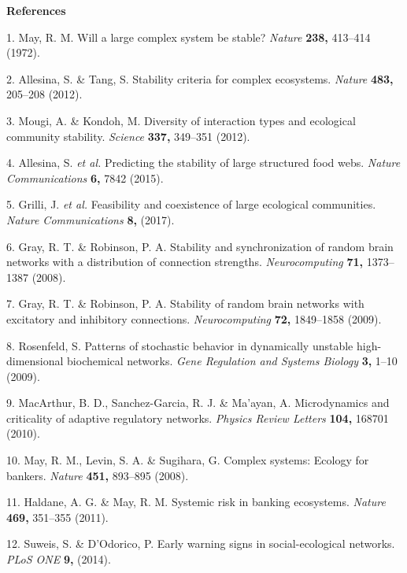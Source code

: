 \documentclass[]{article}
\begin{document}
\textbf{References}

\hypertarget{refs}{}
\hypertarget{ref-May1972}{}
1. May, R. M. Will a large complex system be stable? \emph{Nature}
\textbf{238,} 413--414 (1972).

\hypertarget{ref-Allesina2012}{}
2. Allesina, S. \& Tang, S. Stability criteria for complex ecosystems.
\emph{Nature} \textbf{483,} 205--208 (2012).

\hypertarget{ref-Mougi2012}{}
3. Mougi, A. \& Kondoh, M. Diversity of interaction types and ecological
community stability. \emph{Science} \textbf{337,} 349--351 (2012).

\hypertarget{ref-Allesina2015}{}
4. Allesina, S. \emph{et al.} Predicting the stability of large
structured food webs. \emph{Nature Communications} \textbf{6,} 7842
(2015).

\hypertarget{ref-Grilli2017}{}
5. Grilli, J. \emph{et al.} Feasibility and coexistence of large
ecological communities. \emph{Nature Communications} \textbf{8,} (2017).

\hypertarget{ref-Gray2008}{}
6. Gray, R. T. \& Robinson, P. A. Stability and synchronization of
random brain networks with a distribution of connection strengths.
\emph{Neurocomputing} \textbf{71,} 1373--1387 (2008).

\hypertarget{ref-Gray2009}{}
7. Gray, R. T. \& Robinson, P. A. Stability of random brain networks
with excitatory and inhibitory connections. \emph{Neurocomputing}
\textbf{72,} 1849--1858 (2009).

\hypertarget{ref-Rosenfeld2009}{}
8. Rosenfeld, S. Patterns of stochastic behavior in dynamically unstable
high-dimensional biochemical networks. \emph{Gene Regulation and Systems
Biology} \textbf{3,} 1--10 (2009).

\hypertarget{ref-MacArthur2010}{}
9. MacArthur, B. D., Sanchez-Garcia, R. J. \& Ma'ayan, A. Microdynamics
and criticality of adaptive regulatory networks. \emph{Physics Review
Letters} \textbf{104,} 168701 (2010).

\hypertarget{ref-May2008}{}
10. May, R. M., Levin, S. A. \& Sugihara, G. Complex systems: Ecology
for bankers. \emph{Nature} \textbf{451,} 893--895 (2008).

\hypertarget{ref-Haldane2011}{}
11. Haldane, A. G. \& May, R. M. Systemic risk in banking ecosystems.
\emph{Nature} \textbf{469,} 351--355 (2011).

\hypertarget{ref-Suweis2014}{}
12. Suweis, S. \& D'Odorico, P. Early warning signs in social-ecological
networks. \emph{PLoS ONE} \textbf{9,} (2014).
\end{document}
